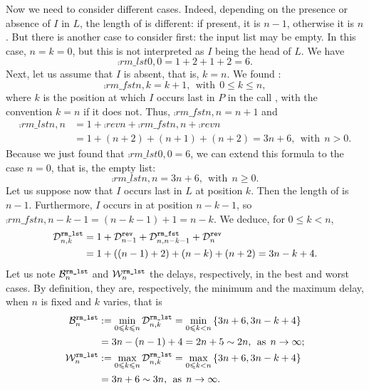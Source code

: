 Now we need to consider different cases. Indeed, depending on the
presence or absence of \(I\) in \(L\), the length of
 is different: if present, it is
\(n-1\), otherwise it is \(n\). But there is another case to consider
first: the input list may be empty. In this case, \(n = k = 0\), but
this is not interpreted as \(I\) being the head of \(L\). We have
\[
\comp{rm\_lst}{0,0} = 1 + 2 + 1 + 2 = 6.
\]
Next, let us assume that \(I\) is absent, that is, \(k = n\). We found
:
\[
\comp{rm\_fst}{n,k} = k + 1,\,\; \text{with} \,\; 0 \leqslant k
\leqslant n,
\]
where \(k\) is the position at which \(I\) occurs last in \(P\) in the
call , with the convention \(k=n\) if it
does not. Thus, \(\comp{rm\_fst}{n,n} = n + 1\) and
\begin{align*}
\comp{rm\_lst}{n,n} 
  &= 1 + \comp{rev}{n} + \comp{rm\_fst}{n,n} + \comp{rev}{n}\\
  &= 1 + (n+2) + (n+1) + (n+2)
   = 3n + 6,\,\; \text{with} \,\; n > 0.
\end{align*}
Because we just found that \(\comp{rm\_lst}{0,0} = 6\), we can extend
this formula to the case \(n=0\), that is, the empty list:
\[
\comp{rm\_lst}{n,n} = 3n + 6,\,\; \text{with} \,\; n \geqslant 0.
\]
Let us suppose now that \(I\) occurs last in \(L\) at position
\(k\). Then the length of  is
\(n-1\). Furthermore, \(I\) occurs in  at position
\(n-k-1\), so \(\comp{rm\_fst}{n,n-k-1} = (n-k-1) + 1 = n-k\). We
deduce, for \(0 \leqslant k < n\),
\begin{align}
\comp{rm\_lst}{n,k} 
  &= 1 + \comp{rev}{n-1} + \comp{rm\_fst}{n,n-k-1} + \comp{rev}{n}\notag\\
  &= 1 + ((n-1)+2) + (n-k) + (n+2) = 3n - k + 4.\label{eq:rm_lst}
\end{align}
Let us note \(\best{rm\_lst}{n}\) and \(\worst{rm\_lst}{n}\) the
delays, respectively, in the best and worst cases. By definition, they
are, respectively, the minimum and the maximum delay, when \(n\) is
fixed and \(k\) varies, that is
\begin{align*}
\best{rm\_lst}{n}
  &:= \min_{0 \leqslant k \leqslant n}{\comp{rm\_lst}{n,k}}
   = \min_{0 \leqslant k < n}{\{3n+6, 3n-k+4\}}\\
  &= 3n - (n-1) + 4
   = 2n + 5 \mathrel{\sim} 2n,\,\; \text{as} \,\; n \rightarrow
     \infty;\\
\worst{rm\_lst}{n}
  &:= \max_{0 \leqslant k \leqslant n}{\comp{rm\_lst}{n,k}}
   = \max_{0 \leqslant k < n}{\{3n+6, 3n-k+4\}}\\
  &= 3n + 6 \mathrel{\sim} 3n,\,\; \text{as} \,\; n \rightarrow
     \infty.
\end{align*}
